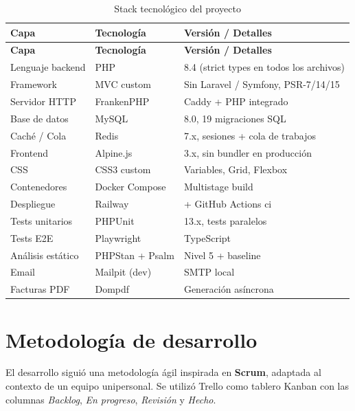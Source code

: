 \documentclass[12pt,a4paper,twoside,openright]{report}
\begin{document}
\begin{longtable}{@{}lll@{}}
  \caption{Stack tecnológico del proyecto}
  \label{tab:stack}\\
  \toprule
  \textbf{Capa} & \textbf{Tecnología} & \textbf{Versión / Detalles}\\
  \midrule
  \endfirsthead
  \toprule
  \textbf{Capa} & \textbf{Tecnología} & \textbf{Versión / Detalles}\\
  \midrule
  \endhead
  \bottomrule
  \endfoot
  Lenguaje backend   & PHP                  & 8.4 (strict types en todos los archivos)\\
  Framework          & MVC custom           & Sin Laravel / Symfony, PSR-7/14/15\\
  Servidor HTTP      & FrankenPHP           & Caddy + PHP integrado\\
  Base de datos      & MySQL                & 8.0, 19 migraciones SQL\\
  Caché / Cola       & Redis                & 7.x, sesiones + cola de trabajos\\
  Frontend           & Alpine.js            & 3.x, sin bundler en producción\\
  CSS                & CSS3 custom          & Variables, Grid, Flexbox\\
  Contenedores       & Docker Compose       & Multistage build\\
  Despliegue         & Railway              & + GitHub Actions \gls{ci}\\
  Tests unitarios    & PHPUnit              & 13.x, tests paralelos\\
  Tests E2E          & Playwright           & TypeScript\\
  Análisis estático  & PHPStan + Psalm      & Nivel 5 + baseline\\
  Email              & Mailpit (dev)        & SMTP local\\
  Facturas PDF       & Dompdf               & Generación asíncrona\\
\end{longtable}

\section{Metodología de desarrollo}
\label{sec:metodologia}

El desarrollo siguió una metodología ágil inspirada en \textbf{Scrum}, adaptada al
contexto de un equipo unipersonal. Se utilizó Trello como tablero Kanban con las
columnas \textit{Backlog}, \textit{En progreso}, \textit{Revisión} y \textit{Hecho}.
\end{document}
